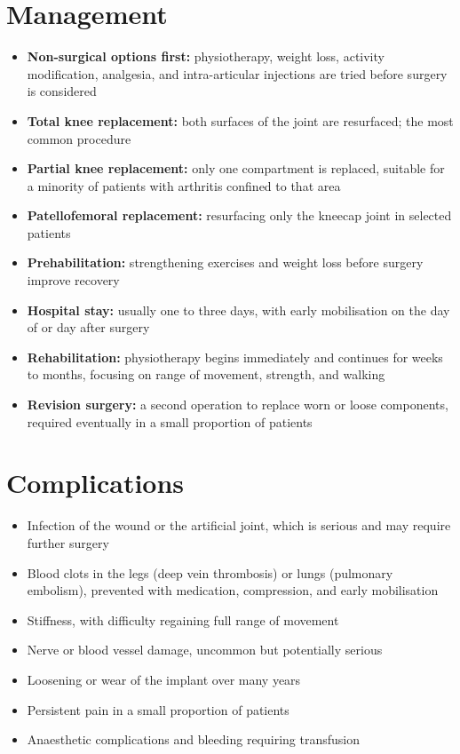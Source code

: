 \section*{Management}
\begin{itemize}
    \item \textbf{Non-surgical options first:} physiotherapy, weight loss, activity modification, analgesia, and intra-articular injections are tried before surgery is considered
    \item \textbf{Total knee replacement:} both surfaces of the joint are resurfaced; the most common procedure
    \item \textbf{Partial knee replacement:} only one compartment is replaced, suitable for a minority of patients with arthritis confined to that area
    \item \textbf{Patellofemoral replacement:} resurfacing only the kneecap joint in selected patients
    \item \textbf{Prehabilitation:} strengthening exercises and weight loss before surgery improve recovery
    \item \textbf{Hospital stay:} usually one to three days, with early mobilisation on the day of or day after surgery
    \item \textbf{Rehabilitation:} physiotherapy begins immediately and continues for weeks to months, focusing on range of movement, strength, and walking
    \item \textbf{Revision surgery:} a second operation to replace worn or loose components, required eventually in a small proportion of patients
\end{itemize}

\section*{Complications}
\begin{itemize}
    \item Infection of the wound or the artificial joint, which is serious and may require further surgery
    \item Blood clots in the legs (deep vein thrombosis) or lungs (pulmonary embolism), prevented with medication, compression, and early mobilisation
    \item Stiffness, with difficulty regaining full range of movement
    \item Nerve or blood vessel damage, uncommon but potentially serious
    \item Loosening or wear of the implant over many years
    \item Persistent pain in a small proportion of patients
    \item Anaesthetic complications and bleeding requiring transfusion
\end{itemize}

